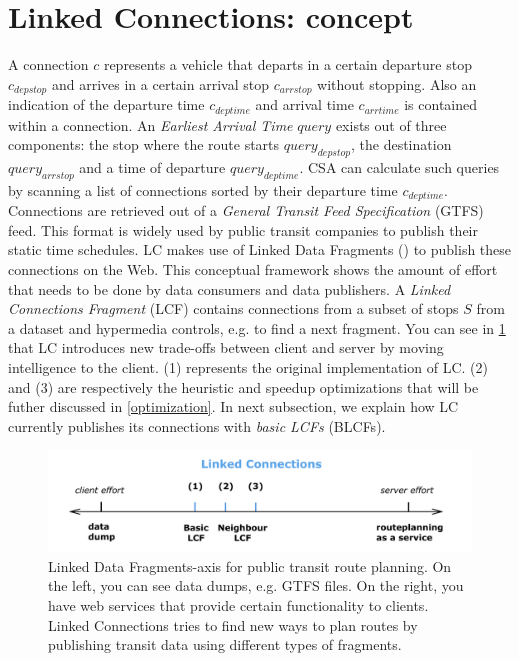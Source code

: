 \documentclass[twocolumn]{phdsymp} %
\begin{document}
\section{Linked Connections: concept}

A connection $c$ represents a vehicle that departs in a certain departure stop $c_{depstop}$ and arrives in a certain arrival stop $c_{arrstop}$ without stopping. Also an indication of the departure time $c_{deptime}$ and arrival time $c_{arrtime}$ is contained within a connection. An \textit{Earliest Arrival Time} $query$ exists out of three components: the stop where the route starts $query_{depstop}$, the destination $query_{arrstop}$ and a time of departure $query_{deptime}$. CSA \cite{csa} can calculate such queries by scanning a list of connections sorted by their departure time $c_{deptime}$.
Connections are retrieved out of a \textit{General Transit Feed Specification} (GTFS) feed. This format is widely used by public transit companies to publish their static time schedules.
LC makes use of Linked Data Fragments (\cite{verborgh_ldow_2014}) to publish these connections on the Web. This conceptual framework shows the amount of effort that needs to be done by data consumers and data publishers. A \textit{Linked Connections Fragment} (LCF) contains connections from a subset of stops $S$ from a dataset and hypermedia controls, e.g. to find a next fragment. You can see in \cref{LDF-asFinalAbstract} that LC introduces new trade-offs between client and server by moving intelligence to the client. (1) represents the original implementation of LC. (2) and (3) are respectively the heuristic and speedup optimizations that will be futher discussed in \cref{optimization}. In next subsection, we explain how LC currently publishes its connections with \textit{basic LCFs} (BLCFs).

\begin{figure}[ht]
\begin{center}
	\includegraphics[width=.40\textwidth]{LDF-asFinalAbstract}
	\caption{\label{LDF-asFinalAbstract}Linked Data Fragments-axis for public transit route planning. On the left, you can see data dumps, e.g. GTFS files. On the right, you have web services that provide certain functionality to clients. Linked Connections tries to find new ways to plan routes by publishing transit data using different types of fragments.}
\end{center}
\end{figure}
\end{document}
